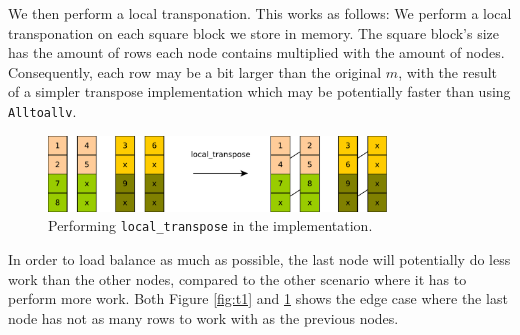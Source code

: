 We then perform a local transponation. This works as follows: We perform a local
transponation on each square block we store in memory. The square block's size
has the amount of rows each node contains multiplied with the amount of nodes.
Consequently, each row may be a bit larger than the original $m$, with the
result of a simpler transpose implementation which may be potentially faster
than using {\tt Alltoallv}.

\begin{figure}[h]
  \centering
  \includegraphics[width=0.8\textwidth]{img/transpose-2.pdf}
  \caption{Performing {\tt local\_transpose} in the implementation.}
  \label{fig:t2}
\end{figure}

In order to load balance as much as possible, the last node will potentially do
less work than the other nodes, compared to the other scenario where it has to
perform more work. Both Figure \ref{fig:t1} and \ref{fig:t2} shows the edge case
where the last node has not as many rows to work with as the previous nodes.
